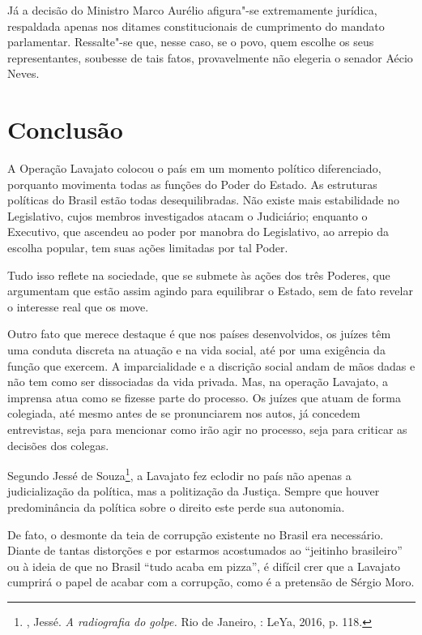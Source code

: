 Já a decisão do Ministro Marco Aurélio afigura"-se extremamente jurídica,
respaldada apenas nos ditames constitucionais de cumprimento do mandato
parlamentar. Ressalte"-se que, nesse caso, se o povo, quem escolhe os
seus representantes, soubesse de tais fatos, provavelmente não elegeria
o senador Aécio Neves.

\section{Conclusão}

A Operação Lavajato colocou o país em um momento político diferenciado,
porquanto movimenta todas as funções do Poder do Estado. As estruturas
políticas do Brasil estão todas desequilibradas. Não existe mais
estabilidade no Legislativo, cujos membros investigados atacam o
Judiciário; enquanto o Executivo, que ascendeu ao poder por manobra do
Legislativo, ao arrepio da escolha popular, tem suas ações limitadas por
tal Poder.

Tudo isso reflete na sociedade, que se submete às ações dos três
Poderes, que argumentam que estão assim agindo para equilibrar o Estado,
sem de fato revelar o interesse real que os move.

Outro fato que merece destaque é que nos países desenvolvidos, os juízes
têm uma conduta discreta na atuação e na vida social, até por uma
exigência da função que exercem. A imparcialidade e a discrição social
andam de mãos dadas e não tem como ser dissociadas da vida privada. Mas,
na operação Lavajato, a imprensa atua como se fizesse parte do processo.
Os juízes que atuam de forma colegiada, até mesmo antes de se
pronunciarem nos autos, já concedem entrevistas, seja para mencionar
como irão agir no processo, seja para criticar as decisões dos colegas.

Segundo Jessé de Souza\footnote{, Jessé. \emph{A radiografia do
  golpe.} Rio de Janeiro, : LeYa, 2016, p. 118.}, a Lavajato fez eclodir
no país não apenas a judicialização da política, mas a politização da
Justiça. Sempre que houver predominância da política sobre o direito
este perde sua autonomia.

De fato, o desmonte da teia de corrupção existente no Brasil era
necessário. Diante de tantas distorções e por estarmos acostumados ao
``jeitinho brasileiro'' ou à ideia de que no Brasil ``tudo acaba em
pizza'', é difícil crer que a Lavajato cumprirá o papel de acabar com a
corrupção, como é a pretensão de Sérgio Moro.

